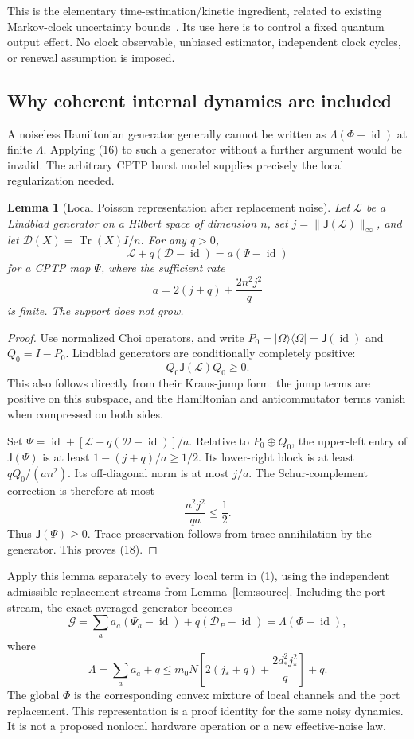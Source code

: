 \documentclass[11pt]{article}
\newtheorem{lemma}[theorem]{Lemma}
\newcommand{\Tr}{\operatorname{Tr}}
\newcommand{\id}{\operatorname{id}}
\newcommand{\D}{\mathcal D}
\newcommand{\G}{\mathcal G}
\newcommand{\J}{\mathsf J}
\begin{document}
This is the elementary time-estimation/kinetic ingredient, related to
existing Markov-clock uncertainty bounds~\cite{Clock}. Its use here is
to control a fixed quantum output effect. No clock observable, unbiased
estimator, independent clock cycles, or renewal assumption is imposed.

\subsection{Why coherent internal dynamics are included}

A noiseless Hamiltonian generator generally cannot be written as
\(\Lambda(\Phi-\id)\) at finite \(\Lambda\). Applying (16) to such
a generator without a further argument would be invalid. The arbitrary
CPTP burst model supplies precisely the local regularization needed.

\begin{lemma}[Local Poisson representation after replacement noise]
\label{lem:unif}
Let \(\mathcal L\) be a Lindblad generator on a Hilbert space of
dimension \(n\), set \(j=\|\J(\mathcal L)\|_\infty\), and let
\(\D(X)=\Tr(X)I/n\). For any \(q>0\),
\[
 \mathcal L+q(\D-\id)=a(\Psi-\id)
 \tag{18}
\]
for a CPTP map \(\Psi\), where the sufficient rate
\[
 a=2(j+q)+\frac{2n^2j^2}{q}
 \tag{19}
\]
is finite. The support does not grow.
\end{lemma}

\begin{proof}
Use normalized Choi operators, and write
\(P_0=|\Omega\rangle\langle\Omega|=\J(\id)\) and \(Q_0=I-P_0\).
Lindblad generators are conditionally completely positive:
\[
 Q_0\J(\mathcal L)Q_0\geq0.
 \tag{20}
\]
This also follows directly from their Kraus-jump form: the jump
terms are positive on this subspace, and the Hamiltonian and
anticommutator terms vanish when compressed on both sides.

Set \(\Psi=\id+[\mathcal L+q(\D-\id)]/a\).
Relative to \(P_0\oplus Q_0\), the upper-left entry of \(\J(\Psi)\)
is at least \(1-(j+q)/a\geq1/2\). Its lower-right block is at least
\(qQ_0/(an^2)\). Its off-diagonal norm is at most \(j/a\).
The Schur-complement correction is therefore at most
\[
 \frac{n^2j^2}{qa}\leq\frac12.
 \tag{21}
\]
Thus \(\J(\Psi)\geq0\). Trace preservation follows from
trace annihilation by the generator. This proves (18).
\end{proof}

Apply this lemma separately to every local term in (1), using the
independent admissible replacement streams from Lemma~\ref{lem:source}.
Including the port stream, the exact averaged generator becomes
\[
 \G=\sum_a a_a(\Psi_a-\id)+q(\D_P-\id)
        =\Lambda(\Phi-\id),
 \tag{22}
\]
where
\[
 \Lambda=\sum_a a_a+q
       \leq m_0N\!\left[2(j_*+q)+
                       \frac{2d_*^2j_*^2}{q}\right]+q.
 \tag{23}
\]
The global \(\Phi\) is the corresponding convex mixture of local
channels and the port replacement. This representation is a proof
identity for the same noisy dynamics. It is not a proposed nonlocal
hardware operation or a new effective-noise law.
\end{document}
